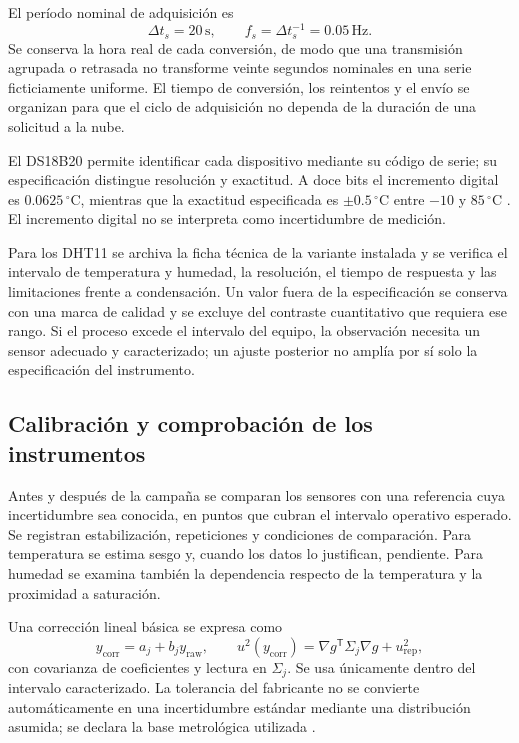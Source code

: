 El período nominal de adquisición es
\begin{equation}
\Delta t_s=20\,\mathrm s,
\qquad
f_s=\Delta t_s^{-1}=0.05\,\mathrm{Hz}.
\label{met:muestreo}
\end{equation}
Se conserva la hora real de cada conversión, de modo que una transmisión agrupada o retrasada no transforme veinte segundos nominales en una serie ficticiamente uniforme. El tiempo de conversión, los reintentos y el envío se organizan para que el ciclo de adquisición no dependa de la duración de una solicitud a la nube.

El DS18B20 permite identificar cada dispositivo mediante su código de serie; su especificación distingue resolución y exactitud. A doce bits el incremento digital es $0.0625\,^{\circ}\mathrm C$, mientras que la exactitud especificada es $\pm0.5\,^{\circ}\mathrm C$ entre $-10$ y $85\,^{\circ}\mathrm C$ \cite{ds18b20_2019}. El incremento digital no se interpreta como incertidumbre de medición.

Para los DHT11 se archiva la ficha técnica de la variante instalada y se verifica el intervalo de temperatura y humedad, la resolución, el tiempo de respuesta y las limitaciones frente a condensación. Un valor fuera de la especificación se conserva con una marca de calidad y se excluye del contraste cuantitativo que requiera ese rango. Si el proceso excede el intervalo del equipo, la observación necesita un sensor adecuado y caracterizado; un ajuste posterior no amplía por sí solo la especificación del instrumento.

\subsection{Calibración y comprobación de los instrumentos}

Antes y después de la campaña se comparan los sensores con una referencia cuya incertidumbre sea conocida, en puntos que cubran el intervalo operativo esperado. Se registran estabilización, repeticiones y condiciones de comparación. Para temperatura se estima sesgo y, cuando los datos lo justifican, pendiente. Para humedad se examina también la dependencia respecto de la temperatura y la proximidad a saturación.

Una corrección lineal básica se expresa como
\begin{equation}
y_{\mathrm{corr}}=a_j+b_jy_{\mathrm{raw}},
\qquad
u^2(y_{\mathrm{corr}})=
\nabla g^{\mathsf T}\Sigma_j\nabla g+u_{\mathrm{rep}}^2,
\label{met:correccion_sensor}
\end{equation}
con covarianza de coeficientes y lectura en $\Sigma_j$. Se usa únicamente dentro del intervalo caracterizado. La tolerancia del fabricante no se convierte automáticamente en una incertidumbre estándar mediante una distribución asumida; se declara la base metrológica utilizada \cite{jcgm2008}.

